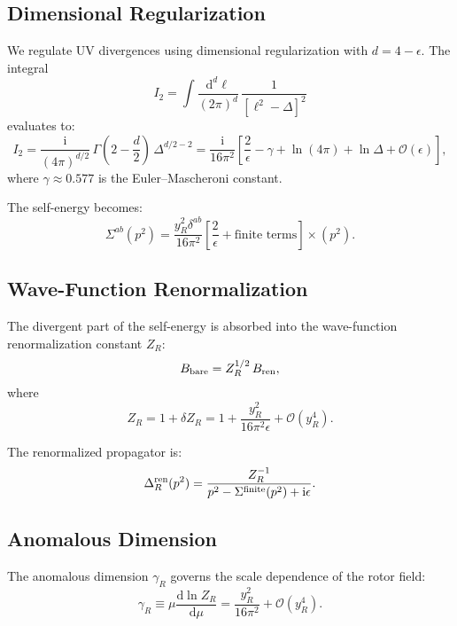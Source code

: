 \documentclass[11pt,a4paper]{article}
\numberwithin{equation}{section}
\theoremstyle{plain}
\theoremstyle{definition}
\theoremstyle{remark}
\newcommand{\dd}{\mathrm{d}}
\newcommand{\ii}{\mathrm{i}}
\begin{document}
\subsection{Dimensional Regularization}

We regulate UV divergences using dimensional regularization with $d=4-\epsilon$. The integral
\begin{equation}
I_2 = \int \frac{\dd^d \ell}{(2\pi)^d}\,\frac{1}{[\ell^2-\Delta]^2}
\label{eq:I2}
\end{equation}
evaluates to:
\begin{equation}
I_2 = \frac{\ii}{(4\pi)^{d/2}}\,\Gamma\left(2-\frac{d}{2}\right)\,\Delta^{d/2-2} = \frac{\ii}{16\pi^2}\left[\frac{2}{\epsilon} - \gamma + \ln(4\pi) + \ln\Delta + \mathcal{O}(\epsilon)\right],
\label{eq:I2-result}
\end{equation}
where $\gamma\approx 0.577$ is the Euler--Mascheroni constant.

The self-energy becomes:
\begin{equation}
\Sigma^{ab}(p^2) = \frac{y_R^2\delta^{ab}}{16\pi^2}\left[\frac{2}{\epsilon} + \text{finite terms}\right]\times (p^2).
\label{eq:Sigma-div}
\end{equation}

\subsection{Wave-Function Renormalization}

The divergent part of the self-energy is absorbed into the wave-function renormalization constant $Z_R$:
\begin{equation}
B_{\rm bare} = Z_R^{1/2}\,B_{\rm ren},
\label{eq:Z-R}
\end{equation}
where
\begin{equation}
Z_R = 1 + \delta Z_R = 1 + \frac{y_R^2}{16\pi^2\epsilon} + \mathcal{O}(y_R^4).
\label{eq:delta-Z-R}
\end{equation}

The renormalized propagator is:
\begin{equation}
\Delta_R^{\rm ren}(p^2) = \frac{Z_R^{-1}}{p^2 - \Sigma^{\rm finite}(p^2) + \ii\epsilon}.
\label{eq:prop-ren}
\end{equation}

\subsection{Anomalous Dimension}

The anomalous dimension $\gamma_R$ governs the scale dependence of the rotor field:
\begin{equation}
\gamma_R \equiv \mu\frac{\dd\ln Z_R}{\dd\mu} = \frac{y_R^2}{16\pi^2} + \mathcal{O}(y_R^4).
\label{eq:gamma-R}
\end{equation}
\end{document}

